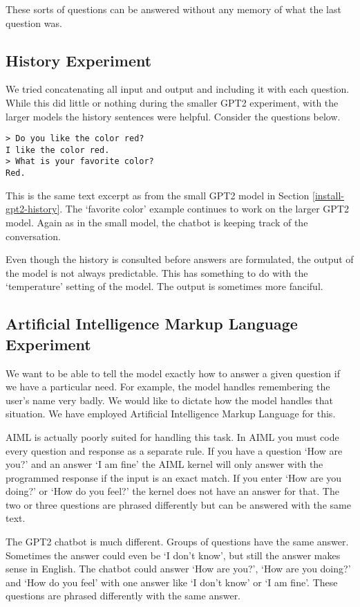 These sorts of questions can be answered without any memory of what the last question was.

\subsection{History Experiment}

We tried concatenating all input and output and including it with each question. While this did little or nothing during the smaller GPT2 experiment, with the larger models the history sentences were helpful. Consider the questions below.
\begin{verbatim}
> Do you like the color red?
I like the color red.
> What is your favorite color?
Red.
\end{verbatim}
This is the same text excerpt as from the small GPT2 model in Section \ref{install-gpt2-history}. The `favorite color' example continues to work on the larger GPT2 model. Again as in the small model, the chatbot is keeping track of the conversation. 

Even though the history is consulted before answers are formulated, the output of the model is not always predictable. This has something to do with the `temperature' setting of the model. The output is sometimes more fanciful.


\subsection{Artificial Intelligence Markup Language Experiment}

We want to be able to tell the model exactly how to answer a given question if we have a particular need. For example, the model handles remembering the user's name very badly. We would like to dictate how the model handles that situation. We have employed Artificial Intelligence Markup Language for this. 

AIML is actually poorly suited for handling this task. In AIML you must code every question and response as a separate rule. If you have a question `How are you?' and an answer `I am fine' the AIML kernel will only answer with the programmed response if the input is an exact match. If you enter `How are you doing?' or `How do you feel?' the kernel does not have an answer for that. The two or three questions are phrased differently but can be answered with the same text.

The GPT2 chatbot is much different. Groups of questions have the same answer. Sometimes the answer could even be `I don't know', but still the answer makes sense in English. The chatbot could answer `How are you?', `How are you doing?' and `How do you feel' with one answer like `I don't know' or `I am fine'. These questions are phrased differently with the same answer.

